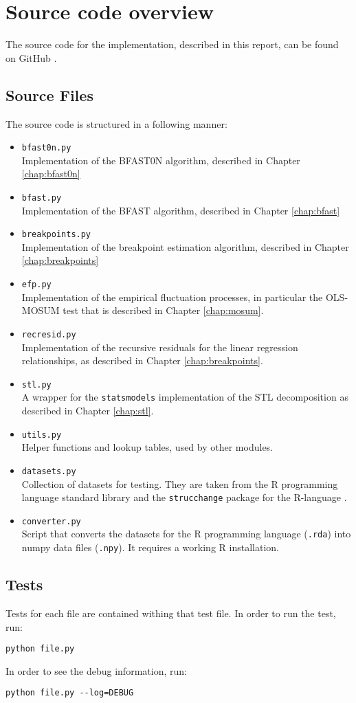 \documentclass[main.tex]{subfiles}
\begin{document}
\chapter{Source code overview}
\label{a_chap:source_code_overview}
The source code for the implementation, described in this report, can be found on GitHub \cite{my-github}.
\section*{Source Files}
\label{sec:source_files}
The source code is structured in a following manner:
\begin{itemize}
\item \texttt{bfast0n.py}\\
  Implementation of the BFAST0N algorithm, described in Chapter \ref{chap:bfast0n}
\item \texttt{bfast.py}\\
  Implementation of the BFAST algorithm, described in Chapter \ref{chap:bfast}
\item \texttt{breakpoints.py}\\
  Implementation of the breakpoint estimation algorithm, described in Chapter \ref{chap:breakpoints}
\item \texttt{efp.py}\\
  Implementation of the empirical fluctuation processes, in particular the OLS-MOSUM test that is
  described in Chapter \ref{chap:mosum}.
\item \texttt{recresid.py}\\
  Implementation of the recursive residuals for the linear regression relationships,
  as described in Chapter \ref{chap:breakpoints}.
\item \texttt{stl.py} \\
  A wrapper for the \texttt{statsmodels} \cite{statsmodels} implementation of the STL decomposition as
  described in Chapter \ref{chap:stl}.
\item \texttt{utils.py} \\
  Helper functions and lookup tables, used by other modules. 
\item \texttt{datasets.py}\\
  Collection of datasets for testing. They are taken from the R programming language standard library
  \cite{r-datasets} and
  the \texttt{strucchange} package for the R-language \cite{strucchange_code}.
\item \texttt{converter.py}\\
  Script that converts the datasets for the R programming language (\texttt{.rda}) into numpy
  data files (\texttt{.npy}). It requires a working R installation.
\end{itemize}

\section*{Tests}
\label{sec:source_files}
Tests for each file are contained withing that test file. In order to run the test, run:
\begin{verbatim}
python file.py
\end{verbatim}
In order to see the debug information, run:
\begin{verbatim}
python file.py --log=DEBUG
\end{verbatim}

\biblio
\end{document}
